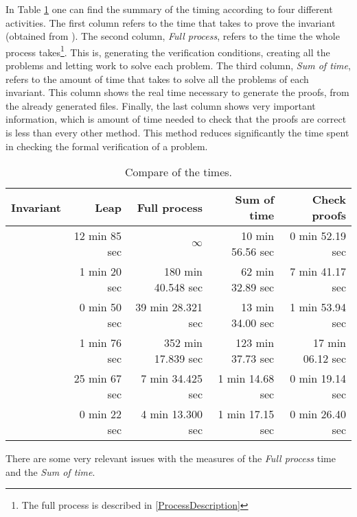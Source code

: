 In Table \ref{analysis::bigtimetable} one can find the summary of the timing according to four different activities. The first column refers to the time that \leap takes to prove the invariant (obtained from \cite{paperParametrizedInvariants}). 
%
The second column, \textit{Full process}, refers to the time the whole process takes\footnote{The full process is described in \ref{ProcessDescription}}. 
%
This is, generating the verification conditions, creating all the \spass problems and letting \spass work to solve each problem.
%
The third column, \textit{Sum of \spass time}, refers to the amount of time that \spass takes to solve all the problems of each invariant.
%
This column shows the real time necessary to generate the proofs, from the already generated files.
%
Finally, the last column shows very important information,
%
which is amount of time needed to check that the proofs are correct is less than every other method. 
%
This method reduces significantly the time spent in checking the formal verification of a problem.


\begin{table}[hbtp]
\centering
\begin{tabular}{r|rrrr}
Invariant 		& Leap 	& Full process 		& Sum of \spass time 	& Check proofs 	\\\hline
\invPreserve 	& 12 min 85	sec & $\infty$			& 10 min 56.56 sec				& 0 min 52.19 sec		\\
\invOrder		& 1 min 20	sec & 180 min 40.548 sec		& 62 min 32.89 sec				& 7 min 41.17 sec 		\\
\invLock		& 0 min 50	sec & 39 min 28.321 sec			& 13 min 34.00 sec 				& 1 min 53.94 sec		\\
\invNext 		& 1 min 76	sec & 352 min 17.839 sec		& 123 min 37.73 sec				& 17 min 06.12 sec		\\
\invRegion		& 25 min 67	sec & 7 min 34.425 sec			& 1 min 14.68 sec				& 0 min 19.14 sec		\\
\invDisjoint 	& 0 min 22 	sec & 4 min 13.300 sec 			& 1 min 17.15 sec 				& 0 min 26.40 sec		\\
\end{tabular}
\caption{Compare of the times.}
\label{analysis::bigtimetable}
\end{table}


There are some very relevant issues with the measures of the \textit{Full process} time and the \textit{Sum of \spass time}.

